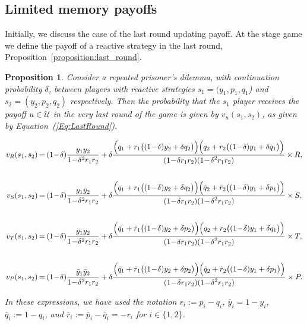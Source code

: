 \documentclass[11pt]{article}
\theoremstyle{plainCl1}
\newtheorem{Prop}{Proposition}
\theoremstyle{plainCl2}
\begin{document}
\subsection*{Limited memory payoffs}

Initially, we discuss the case of the last round updating payoff. At the stage
game we define the payoff of a reactive strategy in the last round,
Proposition~\ref{proposition:last_round}.


\begin{Prop}
    Consider a repeated prisoner's dilemma, with
    continuation probability $\delta$, between players with reactive strategies
    $s_1\!=\!(y_1, p_1, q_1$)  and $s_2\!=\!(y_2,p_2,q_2)$ respectively. Then the
    probability that the $s_1$ player receives the payoff $u\!\in\! \mathcal{U}$ in
    the very last round of the game is given by $v_{u}(s_1,s_2)$, as given by
    Equation~(\ref{Eq:LastRound}).

    \begin{equation} \label{Eq:LastRound}
      \setlength{\arraycolsep}{1pt}
      \begin{array}{rcl}
    
      v_{R}(s_1,s_2) &= &\displaystyle (1\!-\!\delta)\frac{y_1y_2}{1\!-\!\delta^2 r_1 r_2}+\delta \frac{\Big(q_1+r_1\big((1\!-\!\delta)y_2+\delta q_2\big)\Big) \Big(q_2+r_2\big((1\!-\!\delta)y_1+\delta q_1\big)\Big)}
      {\displaystyle(1\!-\!\delta r_1r_2)(1\!-\!\delta^2 r_1 r_2)} \times R,\\[1cm]
    
      v_{S}(s_1,s_2) &= &\displaystyle (1\!-\!\delta)\frac{y_1\bar{y}_2}{1\!-\!\delta^2 r_1 r_2}+\delta \frac{\Big(q_1+r_1\big((1\!-\!\delta)y_2+\delta q_2\big)\Big) \Big(\bar{q}_2+\bar{r}_2\big((1\!-\!\delta)y_1+\delta p_1\big)\Big)}
      {\displaystyle(1\!-\!\delta r_1r_2)(1\!-\!\delta^2 r_1 r_2)} \times S,\\[1cm]
    
      v_{T}(s_1,s_2) &= &\displaystyle (1\!-\!\delta)\frac{\bar{y}_1y_2}{1\!-\!\delta^2 r_1 r_2}+\delta \frac{\Big(\bar{q}_1+\bar{r}_1\big((1\!-\!\delta)y_2+\delta p_2\big)\Big) \Big(q_2+r_2\big((1\!-\!\delta)y_1+\delta q_1\big)\Big)}
      {\displaystyle(1\!-\!\delta r_1r_2)(1\!-\!\delta^2 r_1 r_2)} \times T,\\[1cm]
    
      v_{P}(s_1,s_2) &= &\displaystyle (1\!-\!\delta)\frac{\bar{y}_1\bar{y}_2}{1\!-\!\delta^2 r_1 r_2}+\delta \frac{\Big(\bar{q}_1+\bar{r}_1\big((1\!-\!\delta)y_2+\delta p_2\big)\Big) \Big(\bar{q}_2+\bar{r}_2\big((1\!-\!\delta)y_1+\delta p_1\big)\Big)}
      {\displaystyle(1\!-\!\delta r_1r_2)(1\!-\!\delta^2 r_1 r_2)} \times P.
      \end{array}
    \end{equation}

In these expressions, we have used the notation $r_i:=p_i\!-\!q_i$,
$\bar{y}_i\!=\!1\!-\!y_i$, $\bar{q}_i:=1\!-\!q_i$, and
$\bar{r}_i:=\bar{p}_i\!-\!\bar{q}_i=-r_i$ for $i\!\in\!\{1,2\}$.
\end{Prop}
\end{document}
